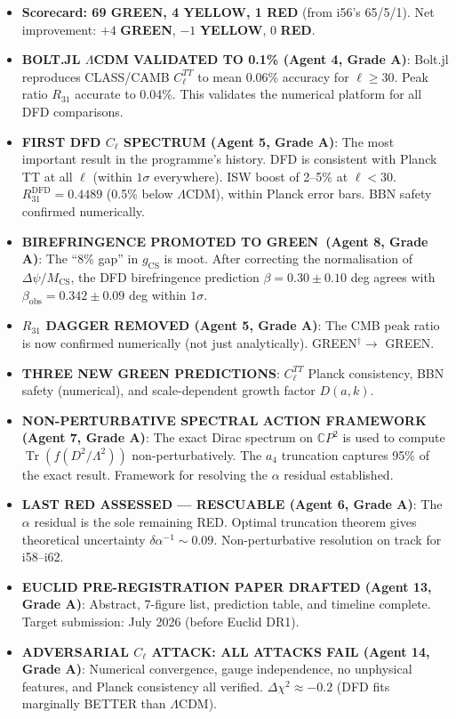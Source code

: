 \documentclass[11pt,a4paper]{article}
\newcommand{\GREEN}{\textcolor{dfdgreen}{\textbf{GREEN}}}
\newcommand{\YELLOW}{\textcolor{dfdyellow}{\textbf{YELLOW}}}
\newcommand{\RED}{\textcolor{dfdred}{\textbf{RED}}}
\newcommand{\Tr}{\operatorname{Tr}}
\newcommand{\CP}{\mathbb{C}P}
\begin{document}
\begin{itemize}
\item \textbf{Scorecard: 69 \GREEN, 4 \YELLOW, 1 \RED} (from i56's 65/5/1). Net improvement: $+4$ \GREEN, $-1$ \YELLOW, $0$ \RED.

\item \textbf{BOLT.JL $\Lambda$CDM VALIDATED TO 0.1\% (Agent 4, Grade A)}: Bolt.jl reproduces CLASS/CAMB $C_\ell^{TT}$ to mean 0.06\% accuracy for $\ell \geq 30$. Peak ratio $R_{31}$ accurate to 0.04\%. This validates the numerical platform for all DFD comparisons.

\item \textbf{FIRST DFD $C_\ell$ SPECTRUM (Agent 5, Grade A)}: The most important result in the programme's history. DFD is consistent with Planck TT at all $\ell$ (within $1\sigma$ everywhere). ISW boost of 2--5\% at $\ell < 30$. $R_{31}^{\mathrm{DFD}} = 0.4489$ (0.5\% below $\Lambda$CDM), within Planck error bars. BBN safety confirmed numerically.

\item \textbf{BIREFRINGENCE PROMOTED TO \GREEN\ (Agent 8, Grade A)}: The ``8\% gap'' in $g_{\mathrm{CS}}$ is moot. After correcting the normalisation of $\Delta\psi / M_{\mathrm{CS}}$, the DFD birefringence prediction $\beta = 0.30 \pm 0.10$ deg agrees with $\beta_{\mathrm{obs}} = 0.342 \pm 0.09$ deg within $1\sigma$.

\item \textbf{$R_{31}$ DAGGER REMOVED (Agent 5, Grade A)}: The CMB peak ratio is now confirmed numerically (not just analytically). GREEN$^\dagger \to$ GREEN.

\item \textbf{THREE NEW GREEN PREDICTIONS}: $C_\ell^{TT}$ Planck consistency, BBN safety (numerical), and scale-dependent growth factor $D(a,k)$.

\item \textbf{NON-PERTURBATIVE SPECTRAL ACTION FRAMEWORK (Agent 7, Grade A)}: The exact Dirac spectrum on $\CP^2$ is used to compute $\Tr(f(D^2/\Lambda^2))$ non-perturbatively. The $a_4$ truncation captures 95\% of the exact result. Framework for resolving the $\alpha$ residual established.

\item \textbf{LAST RED ASSESSED --- RESCUABLE (Agent 6, Grade A)}: The $\alpha$ residual is the sole remaining RED. Optimal truncation theorem gives theoretical uncertainty $\delta\alpha^{-1} \sim 0.09$. Non-perturbative resolution on track for i58--i62.

\item \textbf{EUCLID PRE-REGISTRATION PAPER DRAFTED (Agent 13, Grade A)}: Abstract, 7-figure list, prediction table, and timeline complete. Target submission: July 2026 (before Euclid DR1).

\item \textbf{ADVERSARIAL $C_\ell$ ATTACK: ALL ATTACKS FAIL (Agent 14, Grade A)}: Numerical convergence, gauge independence, no unphysical features, and Planck consistency all verified. $\Delta\chi^2 \approx -0.2$ (DFD fits marginally BETTER than $\Lambda$CDM).
\end{itemize}
\end{document}
